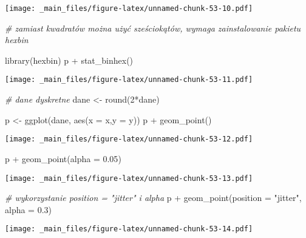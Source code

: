 \documentclass[
]{book}
\newenvironment{Shaded}{\begin{snugshade}}{\end{snugshade}}
\newcommand{\AttributeTok}[1]{\textcolor[rgb]{0.77,0.63,0.00}{#1}}
\newcommand{\CommentTok}[1]{\textcolor[rgb]{0.56,0.35,0.01}{\textit{#1}}}
\newcommand{\DecValTok}[1]{\textcolor[rgb]{0.00,0.00,0.81}{#1}}
\newcommand{\FloatTok}[1]{\textcolor[rgb]{0.00,0.00,0.81}{#1}}
\newcommand{\FunctionTok}[1]{\textcolor[rgb]{0.00,0.00,0.00}{#1}}
\newcommand{\NormalTok}[1]{#1}
\newcommand{\OtherTok}[1]{\textcolor[rgb]{0.56,0.35,0.01}{#1}}
\newcommand{\SpecialCharTok}[1]{\textcolor[rgb]{0.00,0.00,0.00}{#1}}
\newcommand{\StringTok}[1]{\textcolor[rgb]{0.31,0.60,0.02}{#1}}
\begin{document}
\texttt{[image: \_main\_files/figure-latex/unnamed-chunk-53-10.pdf]}

\begin{Shaded}
\begin{Highlighting}[]
\CommentTok{\# zamiast kwadratów można użyć sześciokątów, wymaga zainstalowanie pakietu hexbin}

\FunctionTok{library}\NormalTok{(hexbin)}
\NormalTok{p }\SpecialCharTok{+} \FunctionTok{stat\_binhex}\NormalTok{()}
\end{Highlighting}
\end{Shaded}

\texttt{[image: \_main\_files/figure-latex/unnamed-chunk-53-11.pdf]}

\begin{Shaded}
\begin{Highlighting}[]
\CommentTok{\# dane dyskretne}
\NormalTok{dane }\OtherTok{\textless{}{-}} \FunctionTok{round}\NormalTok{(}\DecValTok{2}\SpecialCharTok{*}\NormalTok{dane)}

\NormalTok{p }\OtherTok{\textless{}{-}} \FunctionTok{ggplot}\NormalTok{(dane, }\FunctionTok{aes}\NormalTok{(}\AttributeTok{x =}\NormalTok{ x,}\AttributeTok{y =}\NormalTok{ y))}
\NormalTok{p }\SpecialCharTok{+} \FunctionTok{geom\_point}\NormalTok{()}
\end{Highlighting}
\end{Shaded}

\texttt{[image: \_main\_files/figure-latex/unnamed-chunk-53-12.pdf]}

\begin{Shaded}
\begin{Highlighting}[]
\NormalTok{p }\SpecialCharTok{+} \FunctionTok{geom\_point}\NormalTok{(}\AttributeTok{alpha =} \FloatTok{0.05}\NormalTok{)}
\end{Highlighting}
\end{Shaded}

\texttt{[image: \_main\_files/figure-latex/unnamed-chunk-53-13.pdf]}

\begin{Shaded}
\begin{Highlighting}[]
\CommentTok{\# wykorzystanie position = "jitter" i alpha}
\NormalTok{p }\SpecialCharTok{+} \FunctionTok{geom\_point}\NormalTok{(}\AttributeTok{position =} \StringTok{"jitter"}\NormalTok{, }\AttributeTok{alpha =} \FloatTok{0.3}\NormalTok{)}
\end{Highlighting}
\end{Shaded}

\texttt{[image: \_main\_files/figure-latex/unnamed-chunk-53-14.pdf]}
\end{document}

